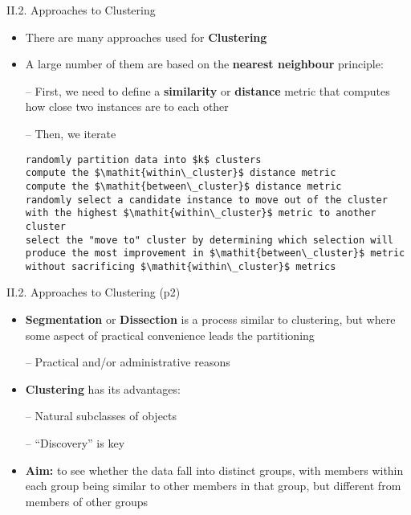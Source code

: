 \documentclass[handout]{beamer}
\newcommand{\strong}[1]{\textbf{\color{teal} #1}}
\newcommand{\stronger}[1]{\textbf{\color{purple} #1}}
\begin{document}
\begin{frame}[fragile]{II.2. Approaches to Clustering}
\begin{itemize}
\item There are many approaches used for \stronger{Clustering}
\item A large number of them are based on the \stronger{nearest neighbour} principle:
\item[--] First, we need to define a \strong{similarity} or \strong{distance} metric that computes how close two instances are to each other
\item[--] Then, we iterate
\begin{lstlisting}
randomly partition data into $k$ clusters
compute the $\mathit{within\_cluster}$ distance metric
compute the $\mathit{between\_cluster}$ distance metric
randomly select a candidate instance to move out of the cluster with the highest $\mathit{within\_cluster}$ metric to another cluster
select the "move to" cluster by determining which selection will produce the most improvement in $\mathit{between\_cluster}$ metric without sacrificing $\mathit{within\_cluster}$ metrics
\end{lstlisting}
\end{itemize}
\end{frame}
\begin{frame}{II.2. Approaches to Clustering (p2)}
\begin{itemize}
\item \stronger{Segmentation} or \stronger{Dissection} is a process similar to clustering, but where some aspect of practical convenience leads the partitioning
\item[--] Practical and/or administrative reasons
\item \stronger{Clustering} has its advantages:
\item[--] Natural subclasses of objects
\item[--] ``Discovery'' is key
\item \strong{Aim:} to see whether the data fall into distinct groups, with members within each group being similar to other members in that group, but different from members of other groups
\end{itemize}
\end{frame}
\end{document}
